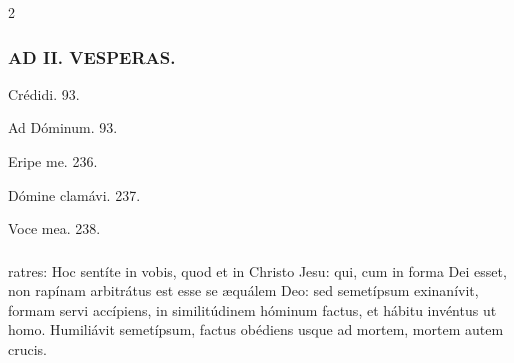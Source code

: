 \documentclass[9pt,twoside]{extarticle}
\begin{document}
\begin{multicols}{2}
\subsubsection*{\center \textsc{AD II. VESPERAS.}}
\begin{tightlist}{}
\item {}
\item {} Crédidi. 93. 
\item {} Ad Dóminum. 93. 
\item {} Eripe me. 236. 
\item {} Dómine clamávi. 237. 
\item {} Voce mea. 238.
\end{tightlist}

\subsubsection*{}
ratres: Hoc sentíte in vobis, quod et in Christo Jesu: qui, cum in forma Dei esset, non rapínam arbitrátus est esse se æquálem Deo: sed semetípsum exinanívit, formam servi accípiens, in similitúdinem hóminum factus, et hábitu invéntus ut homo. Humiliávit semetípsum, factus obédiens usque ad mortem, mortem autem crucis.


\end{multicols}
\end{document}
